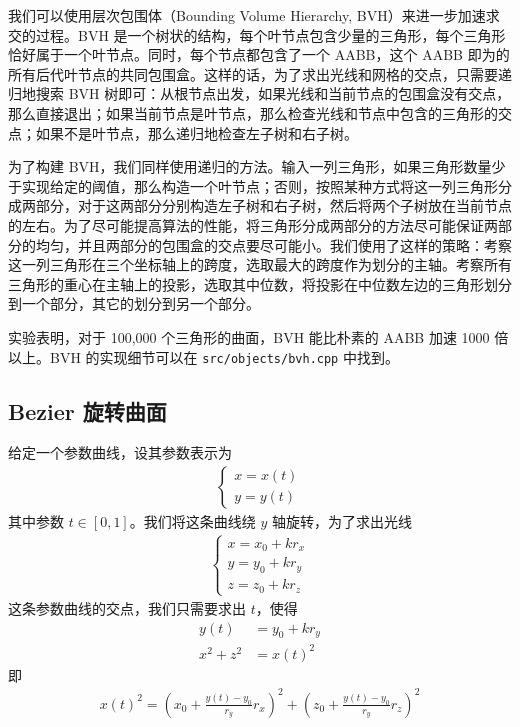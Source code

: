 \documentclass[cn]{report}
\let\t\texttt
\begin{document}
    我们可以使用层次包围体（Bounding Volume Hierarchy, BVH）来进一步加速求交的过程。BVH 是一个树状的结构，每个叶节点包含少量的三角形，每个三角形恰好属于一个叶节点。同时，每个节点都包含了一个 AABB，这个 AABB 即为的所有后代叶节点的共同包围盒。这样的话，为了求出光线和网格的交点，只需要递归地搜索 BVH 树即可：从根节点出发，如果光线和当前节点的包围盒没有交点，那么直接退出；如果当前节点是叶节点，那么检查光线和节点中包含的三角形的交点；如果不是叶节点，那么递归地检查左子树和右子树。

    为了构建 BVH，我们同样使用递归的方法。输入一列三角形，如果三角形数量少于实现给定的阈值，那么构造一个叶节点；否则，按照某种方式将这一列三角形分成两部分，对于这两部分分别构造左子树和右子树，然后将两个子树放在当前节点的左右。为了尽可能提高算法的性能，将三角形分成两部分的方法尽可能保证两部分的均匀，并且两部分的包围盒的交点要尽可能小。我们使用了这样的策略：考察这一列三角形在三个坐标轴上的跨度，选取最大的跨度作为划分的主轴。考察所有三角形的重心在主轴上的投影，选取其中位数，将投影在中位数左边的三角形划分到一个部分，其它的划分到另一个部分。

    实验表明，对于 100,000 个三角形的曲面，BVH 能比朴素的 AABB 加速 1000 倍以上。BVH 的实现细节可以在 \t{src/objects/bvh.cpp} 中找到。

    \subsection{Bezier 旋转曲面}

    给定一个参数曲线，设其参数表示为 \begin{align}
        \begin{cases}
            x = x(t) \\
            y = y(t)
        \end{cases}
    \end{align} 其中参数 $t \in [0, 1]$。我们将这条曲线绕 $y$ 轴旋转，为了求出光线 \begin{align}
        \begin{cases}
            x = x_0 + k r_x \\
            y = y_0 + k r_y \\
            z = z_0 + k r_z
        \end{cases}
    \end{align}
    这条参数曲线的交点，我们只需要求出 $t$，使得 \begin{align}
        y(t) &= y_0 + k r_y \\
        x^2 + z^2 &= x(t)^2
    \end{align}
    即 \begin{align}
        x(t)^2 =
        \left(x_0 + \frac{y(t) - y_0}{r_y} r_x\right)^2
        + \left(z_0 + \frac{y(t) - y_0}{r_y} r_z\right)^2
    \end{align}
\end{document}
